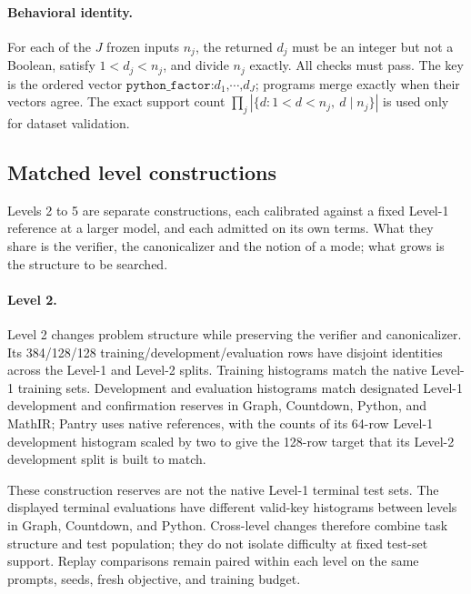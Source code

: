 \documentclass{article}
\newcommand{\1}{\mathbf 1}
\theoremstyle{remark}
\theoremstyle{definition}
\theoremstyle{plain}
\begin{document}
\paragraph{Behavioral identity.}
\label{app:python-identity}
For each of the $J$ frozen inputs $n_j$, the returned $d_j$ must be an integer
but not a Boolean, satisfy $1<d_j<n_j$, and divide $n_j$ exactly. All checks
must pass. The key is the ordered vector
$\texttt{python\_factor:}d_1\texttt{,}\cdots\texttt{,}d_J$;
programs merge exactly when their vectors agree. The exact support count
$\prod_j|\{d:1<d<n_j,\ d\mid n_j\}|$ is used only for dataset validation.

\subsection{Matched level constructions}
\label{app:data-levels}

Levels 2 to 5 are separate constructions, each calibrated against a fixed
Level-1 reference at a larger model, and each admitted on its own terms. What
they share is the verifier, the canonicalizer and the notion of a mode; what
grows is the structure to be searched.

\paragraph{Level 2.}
Level 2 changes problem structure while preserving the verifier and
canonicalizer. Its 384/128/128 training/development/evaluation rows have
disjoint identities across the Level-1 and Level-2 splits. Training histograms
match the native Level-1 training sets. Development and evaluation histograms
match designated Level-1 development and confirmation reserves in Graph,
Countdown, Python, and MathIR; Pantry uses native references, with the counts
of its 64-row Level-1 development histogram scaled by two to give the 128-row
target that its Level-2 development split is built to match.

These construction reserves are not the native Level-1 terminal test sets.
The displayed terminal evaluations have different valid-key histograms
between levels in Graph, Countdown, and Python. Cross-level changes therefore
combine task structure and test population; they do not isolate difficulty
at fixed test-set support. Replay comparisons remain paired within each
level on the same prompts, seeds, fresh objective, and training budget.
\end{document}
